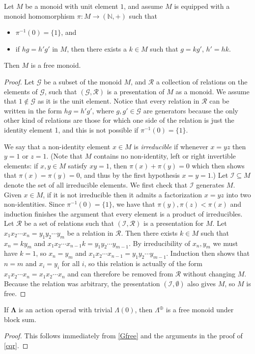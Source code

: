 \documentclass{amsbook} %
\newcommand{\ML}{\mathbf{\Lambda}}
\numberwithin{section}{chapter}
\begin{document}
\begin{prop}\label{Gfree}
Let $M$ be a monoid with unit element $1$, and assume $M$ is equipped with a monoid homomorphism $\pi \colon  M \rightarrow (\mathbb{N}, +)$ such that 
\begin{itemize}
\item $\pi^{-1}(0) = \{1\}$, and
\item if $hg = h' g'$ in $M$, then there exists a $k \in M$ such that $g = kg'$, $h' = hk$.
\end{itemize}
Then $M$ is a free monoid.
\end{prop}
\begin{proof}
Let $\mathcal{G}$ be a subset of the monoid $M$, and $\mathcal{R}$ a collection of relations on the elements of $\mathcal{G}$, such that $(\mathcal{G},\mathcal{R})$ is a presentation of $M$ as a monoid. We assume that $1 \notin \mathcal{G}$ as it is the unit element. Notice that every relation in $\mathcal{R}$ can be written in the form $h g = h' g'$, where $g,g' \in \mathcal{G}$ are generators because the only other kind of relations are those for which one side of the relation is just the identity element 1, and  this is not possible if $\pi^{-1}(0) = \{1\}$. 
 
We say that a non-identity element $x \in M$ is \emph{irreducible} if whenever $x = yz$ then $y=1$ or $z=1$. (Note that $M$ contains no non-identity, left or right invertible elements: if $x, y \in M$ satisfy $xy = 1$, then $\pi(x) + \pi(y) = 0$ which then shows that $\pi(x) = \pi(y) = 0$, and thus by the first hypothesis $x = y = 1$.) Let $\mathcal{I} \subseteq M$ denote the set of all irreducible elements. We first check that $\mathcal{I}$ generates $M$. Given $x \in M$, if it is not irreducible then it admits a factorization $x = yz$ into two non-identities. Since $\pi^{-1}(0) = \{1\}$, we have that $\pi(y), \pi(z) < \pi(x)$ and induction finishes the argument that every element is a product of irreducibles. Let $\mathcal{R}$ be a set of relations such that $(\mathcal{I}, \mathcal{R})$ is a presentation for $M$. Let $x_1 x_2 \cdots x_n = y_1 y_2 \cdots y_m$ be a relation in $\mathcal{R}$. Then there exists  $k \in M$ such that $x_n = k y_m$ and $x_1 x_2 \cdots x_{n-1} k = y_1 y_2 \cdots y_{m-1}$. By irreducibility of $x_n, y_m$ we must have $k=1$, so $x_n = y_m$ and $x_1 x_2 \cdots x_{n-1} = y_1 y_2 \cdots y_{m-1}$. Induction then shows that $n=m$ and $x_i = y_i$ for all $i$, so this relation is actually of the form $x_1 x_2 \cdots x_n =x_1 x_2 \cdots x_n$ and can therefore be removed from $\mathcal{R}$ without changing $M$. Because the relation was arbitrary, the presentation $(\mathcal{I}, \emptyset)$ also gives $M$, so $M$ is free.
\end{proof}
\begin{cor}\label{cor:ML_free}
If $\ML$ is an action operad with trivial $\Lambda(0)$, then $\Lambda^{\oplus}$ is a free monoid under block sum.
\end{cor}
\begin{proof}
This follows immediately from \cref{Gfree} and the arguments in the proof of \cref{cqr}.
\end{proof}
\end{document}
